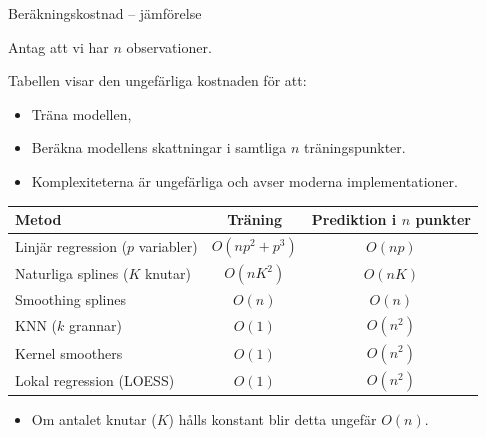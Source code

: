 \documentclass[10pt,english]{beamer}
\begin{document}
\begin{frame}{Beräkningskostnad -- jämförelse}

    Antag att vi har \(n\) observationer.

    \medskip

    Tabellen visar den ungefärliga kostnaden för att:
    \begin{itemize}
        \item Träna modellen,
        \item Beräkna modellens skattningar i samtliga \(n\) träningspunkter.
        \item Komplexiteterna är ungefärliga och avser moderna implementationer.
    \end{itemize}

    \medskip

    \begin{center}
        \begin{tabular}{lcc}
            \toprule
            Metod & Träning & Prediktion i \(n\) punkter \\
            \midrule
            Linjär regression (\(p\) variabler)
              & \(O(np^2+p^3)\)
              & \(O(np)\)  \\

            Naturliga splines (\(K\) knutar)
                & \(O(nK^2)\)
                & \(O(nK)\) \\

            Smoothing splines
                & \(O(n)\)
                & \(O(n)\) \\

            KNN (\(k\) grannar)
                & \(O(1)\)
                & \(O(n^2)\) \\

            Kernel smoothers
                & \(O(1)\)
                & \(O(n^2)\) \\

            Lokal regression (LOESS)
                & \(O(1)\)
                & \(O(n^2)\) \\

            \bottomrule
        \end{tabular}
    \end{center}
  \begin{itemize}
    \item Om antalet knutar ($K$) hålls konstant blir detta ungefär \(O(n)\).
  \end{itemize}
\end{frame}
\end{document}
